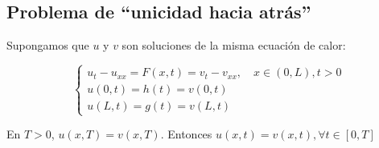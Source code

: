 	 \subsection{Problema de ``unicidad hacia atrás''}

	 	\begin{theorem}

		 	Supongamos que $u$ y $v$ son soluciones de la misma ecuación de calor:

		 	\[\begin{cases}
		 		u_t - u_{xx} = F(x,t) = v_t - v_{xx}, \quad x \in (0,L), t > 0 \\
		 		u(0,t) = h(t) = v(0,t) \\
		 		u(L,t) = g(t) = v(L,t)
		 	\end{cases}\]

		 	En $T > 0$, $u(x,T) = v(x,T)$. Entonces $u(x,t) = v(x,t), \forall t \in [0,T]$

		\end{theorem}

